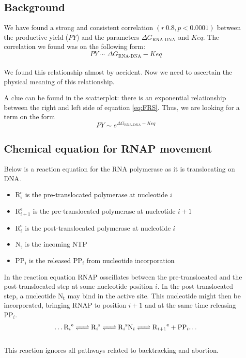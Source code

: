 \documentclass[a4paper]{article}
\newcommand{\te}[1]{\text{#1}}
\begin{document}
 
\noindent

\subsection{Background}
We have found a strong and consistent correlation $(r ~ 0.8, p < 0.0001)$
between the productive yield ($PY$) and the parameters $\Delta
G_{\text{RNA-DNA}}$ and $Keq$. The correlation we found was
on the following form:
\\
\begin{equation}
	PY \sim \Delta G_{\text{RNA-DNA}} - Keq
	\label{eq:FRS}
\end{equation}
\\
We found this relationship almost by accident. Now  we need to ascertain the
physical meaning of this relationship.

A clue can be found in the scatterplot: there is an exponential relationship between
the right and left side of equation \ref{eq:FRS}. Thus, we are looking for a
term on the form
\begin{equation}
	PY \sim e^{\Delta G_{\text{RNA-DNA}} - Keq}
	\label{eq:goal}
\end{equation}

\subsection{Chemical equation for RNAP movement}

Below is a reaction equation for the RNA polymerase as it is translocating on DNA.

\begin{itemize}
	\item $\te{R}_i^{\te{e}}$ is the pre-translocated polymerase at nucleotide $i$
	\item $\te{R}_{i+1}^{\te{e}}$ is the pre-translocated polymerase at nucleotide $i+1$
	\item $\te{R}_i^{\te{s}}$ is the post-translocated polymerase at nucleotide $i$
	\item $\te{N}_{\te{t}}$ is the incoming NTP
	\item $\te{PP}_i$ is the released $\te{PP}_i$ from nucleotide incorporation
\end{itemize}
In the reaction equation RNAP osscillates between the pre-translocated and the
post-translocated step at some nucleotide position $i$. In the
post-translocated step, a nucleotide $\te{N}_{\te{t}}$ may bind in the active
site. This nucleotide might then be incorporated, bringing RNAP to position
$i+1$ and at the same time releasing $\te{PP}_i$.
\\
\begin{align}
\dots\ce{R_i^{\text{e}}
<=>
R_i^{\text{s}}
<=>
R_i^{\text{s}}N_t
<=>
R_{i+1}^{\text{e}}
+ PP_i\dots
}
\label{eq:full}
\end{align}
\\
This reaction ignores all pathways related to backtracking and abortion.
\end{document}

